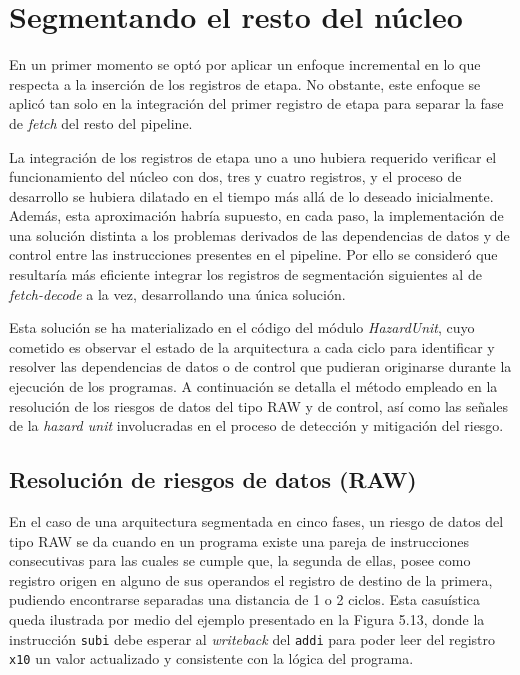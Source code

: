 \section{Segmentando el resto del núcleo}

En un primer momento se optó por aplicar un enfoque incremental en lo que respecta a la inserción de los registros de etapa. No obstante, este enfoque se aplicó tan solo en la integración del primer registro de etapa para separar la fase de \textit{fetch} del resto del pipeline.

La integración de los registros de etapa uno a uno hubiera requerido verificar el funcionamiento del núcleo con dos, tres y cuatro registros, y el proceso de desarrollo se hubiera dilatado en el tiempo más allá de lo deseado inicialmente. Además, esta aproximación habría supuesto, en cada paso, la implementación de una solución distinta a los problemas derivados de las dependencias de datos y de control entre las instrucciones presentes en el pipeline. Por ello se consideró que resultaría más eficiente integrar los registros de segmentación siguientes al de \textit{fetch-decode} a la vez, desarrollando una única solución.

Esta solución se ha materializado en el código del módulo \textit{HazardUnit}, cuyo cometido es observar el estado de la arquitectura a cada ciclo para identificar y resolver las dependencias de datos o de control que pudieran originarse durante la ejecución de los programas. A continuación se detalla el método empleado en la resolución de los riesgos de datos del tipo RAW y de control, así como las señales de la \textit{hazard unit} involucradas en el proceso de detección y mitigación del riesgo.

\subsection{Resolución de riesgos de datos (RAW)}

En el caso de una arquitectura segmentada en cinco fases, un riesgo de datos del tipo RAW se da cuando en un programa existe una pareja de instrucciones consecutivas para las cuales se cumple que, la segunda de ellas, posee como registro origen en alguno de sus operandos el registro de destino de la primera, pudiendo encontrarse separadas una distancia de 1 o 2 ciclos. Esta casuística queda ilustrada por medio del ejemplo presentado en la Figura 5.13, donde la instrucción \texttt{subi} debe esperar al \textit{writeback} del \texttt{addi} para poder leer del registro \texttt{x10} un valor actualizado y consistente con la lógica del programa.


